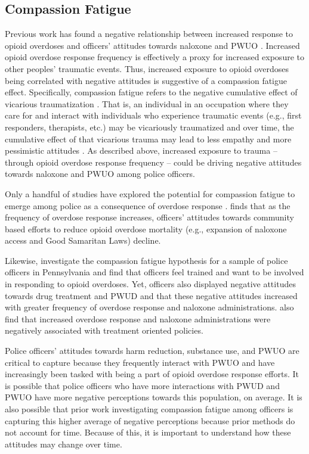 \subsection{Compassion Fatigue}

Previous work has found a negative relationship between increased response to opioid overdoses and officers’ attitudes towards naloxone and PWUO \parencite{carroll_knowledge_2020, murphy_police_2020, murphy_police_2021}. Increased opioid overdose response frequency is effectively a proxy for increased exposure to other peoples' traumatic events. Thus, increased exposure to opioid overdoses being correlated with negative attitudes is suggestive of a compassion fatigue effect. Specifically, compassion fatigue refers to the negative cumulative effect of vicarious traumatization \parencite{adams_compassion_2006}. That is, an individual in an occupation where they care for and interact with individuals who experience traumatic events (e.g., first responders, therapists, etc.) may be vicariously traumatized and over time, the cumulative effect of that vicarious trauma may lead to less empathy and more pessimistic attitudes \parencite{adams_compassion_2006, figley_compassion_1995}. As described above, increased exposure to trauma -- through opioid overdose response frequency -- could be driving negative attitudes towards naloxone and PWUO among police officers.

Only a handful of studies have explored the potential for compassion fatigue to emerge among police as a consequence of overdose response \parencite{banta-green_police_2013, saunders_you_2019}. \textcite{carroll_knowledge_2020} finds that as the frequency of overdose response increases, officers' attitudes towards community based efforts to reduce opioid overdose mortality (e.g., expansion of naloxone access and Good Samaritan Laws) decline.

Likewise, \textcite{murphy_police_2020} investigate the compassion fatigue hypothesis for a sample of police officers in Pennsylvania and find that officers feel trained and want to be involved in responding to opioid overdoses. Yet, officers also displayed negative attitudes towards drug treatment and PWUD and that these negative attitudes increased with greater frequency of overdose response and naloxone administrations. \textcite{murphy_police_2021} also find that increased overdose response and naloxone administrations were negatively associated with treatment oriented policies. 

Police officers’ attitudes towards harm reduction, substance use, and PWUO are critical to capture because they frequently interact with PWUO and have increasingly been tasked with being a part of opioid overdose response efforts. It is possible that police officers who have more interactions with PWUD and PWUO have more negative perceptions towards this population, on average. It is also possible that prior work investigating compassion fatigue among officers is capturing this higher average of negative perceptions because prior methods do not account for time. Because of this, it is important to understand how these attitudes may change over time. 

